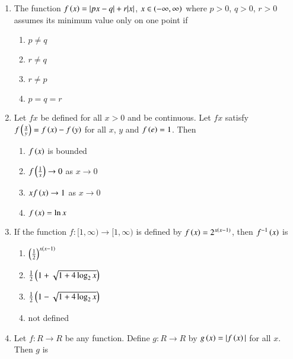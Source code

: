 \documentclass[journal,12pt,twocolumn]{IEEEtran}
\theoremstyle{remark}
\begin{document}
\begin{enumerate}
\item The function $f\left(x\right)=|px-q|+r|x|$, $x\in\left(-\infty,\infty\right)$ where $p>0$, $q>0$, $r>0$ assumes its minimum value only on one point if

\hfill{}

\begin{multicols}{2}
	\begin{enumerate}
		\item $p\neq q$
		\item $r\neq q$
		\item $r\neq p$ 
		\item $p=q=r$
	\end{enumerate}
\end{multicols}

\item Let $f{x}$ be defined for all $x>0$ and be continuous. Let $f{x}$ satisfy $f\left(\frac{x}{y}\right)=f\left(x\right)-f\left(y\right)$ for all $x$, $y$ and $f\left(e\right)=1$. Then

\hfill{}

\begin{multicols}{2}
	\begin{enumerate}
		\item $f\left(x\right)$ is bounded 
		\item $f\left(\frac{1}{x}\right)\to0$ as $x\to0$
		\item $xf\left(x\right)\to1$ as $x\to0$ 
		\item $f\left(x\right)=\ln{x}$
	\end{enumerate}
\end{multicols}

\item If the function $f:[1,\infty)\to[1,\infty)$ is defined by $f\left(x\right)=2^{x\left(x-1\right)}$, then $f^{-1}\left(x\right)$ is

\hfill{}

\begin{multicols}{2}
	\begin{enumerate}
		\item $\left(\frac{1}{2}\right)^{x\left(x-1\right)}$ 
		\item $\frac{1}{2}\left(1+\sqrt{1+4\log_{2}{x}}\right)$
		\item $\frac{1}{2}\left(1-\sqrt{1+4\log_{2}{x}}\right)$ 
		\item not defined
	\end{enumerate}
\end{multicols}

\item Let $f:R\to R$ be any function. Define $g:R\to R$ by $g\left(x\right)=|f\left(x\right)|$ for all $x$. Then $g$ is


\end{enumerate}
\end{document}
